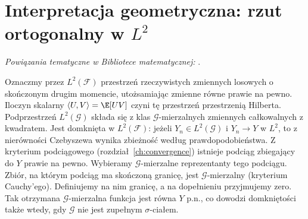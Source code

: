 \section{Interpretacja geometryczna: rzut ortogonalny w \texorpdfstring{$L^2$}{L2}}

\noindent\emph{Powiązania tematyczne w Bibliotece matematycznej:} .


Oznaczmy przez $L^2(\mathcal F)$ przestrzeń
rzeczywistych zmiennych losowych o skończonym drugim
momencie, utożsamiając zmienne równe prawie na pewno.
Iloczyn skalarny $\langle U,V\rangle=\E[UV]$
czyni tę przestrzeń przestrzenią Hilberta.
Podprzestrzeń $L^2(\mathcal G)$ składa się z klas
$\mathcal G$-mierzalnych zmiennych całkowalnych z
kwadratem. Jest domknięta w $L^2(\mathcal F)$:
jeżeli $Y_n\in L^2(\mathcal G)$ i $Y_n\to Y$
w $L^2$, to z nierówności Czebyszewa wynika
zbieżność według prawdopodobieństwa. Z kryterium podciągowego (rozdział~\ref{ch:convergence}) istnieje
podciąg zbiegający do $Y$ prawie na pewno.
Wybieramy $\mathcal G$-mierzalne reprezentanty
tego podciągu. Zbiór, na którym podciąg ma skończoną
granicę, jest $\mathcal G$-mierzalny (kryterium
Cauchy'ego). Definiujemy na nim granicę, a na
dopełnieniu przyjmujemy zero. Tak otrzymana
$\mathcal G$-mierzalna funkcja jest równa $Y$ p.n.,
co dowodzi domkniętości także wtedy, gdy
$\mathcal G$ nie jest zupełnym $\sigma$-ciałem.

